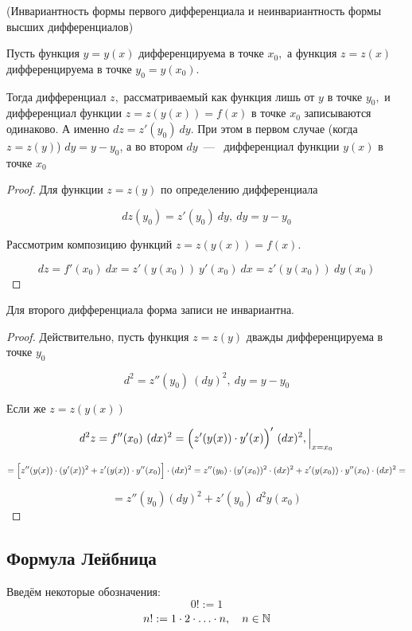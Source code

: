 \begin{theorem}
    \hypertarget{thrm5.7}{(Инвариантность формы первого дифференциала и неинвариантность формы высших дифференциалов)} Пусть функция $y = y(x)$ дифференцируема в точке $x_{0},$ а функция $z = z(x)$ дифференцируема в точке $y_{0} = y(x_{0}).$

    Тогда дифференциал $z,$ рассматриваемый как функция лишь от $y$ в точке $y_{0},$  и дифференциал функции $z= z(y(x)) = f(x)$ в точке $x_{0}$ записываются одинаково. А именно $dz = z'(y_{0}) \ dy$. При этом в первом случае (когда $z=z(y)$) $dy = y-y_{0}$, а во втором $dy$~---~ дифференциал функции $y(x)$ в точке $x_{0}$
\end{theorem}
\begin{proof}
    Для функции $z = z(y)$ по определению дифференциала 
    
    $$dz(y_{0}) = z'(y_{0}) \ dy, \ dy = y-y_{0}$$

    Рассмотрим композицию функций $z = z(y(x)) = f(x)$.

    $$dz = f'(x_{0}) \ dx = z'(y(x_{0})) \ y'(x_{0}) \ dx = z'(y(x_{0})) \ dy(x_{0})$$
\end{proof}

\begin{note}
    Для второго дифференциала форма записи не инвариантна.
\end{note}
\begin{proof}
    Действительно, пусть функция $z = z(y)$ дважды дифференцируема в точке $y_{0}$

    $$d^{2} = z''(y_{0}) \ (dy)^{2}, \ dy = y-y_{0}$$

    Если же $z = z(y(x))$

    $$d^{2} z = f''(x_{0}) \ (dx)^{2} = \Bigl( z'(y(x)) \cdot y'(x) \Bigr)' \ (dx)^{2}, \Big|_{x = x_{0}}
    $$
    
    $$
    = \Bigl[z''(y(x)) \cdot (y'(x))^{2} + z'(y(x))\cdot y''(x_{0}) \Bigr] \cdot (dx)^{2} = z''(y_{0}) \cdot (y'(x_{0}))^{2} \cdot (dx)^{2} + z'(y(x_{0})) \cdot y''(x_{0}) \cdot (dx)^{2} =$$

    $$
    = z''(y_{0}) (dy)^2 + z'(y_{0}) \ d^{2} y(x_{0})
    $$
\end{proof}

\subsection{Формула Лейбница}
Введём некоторые обозначения: 
$$0! :=1$$
$$ n! := 1 \cdot 2 \cdot \ldots \cdot n, \quad n \in \mathbb{N} $$

